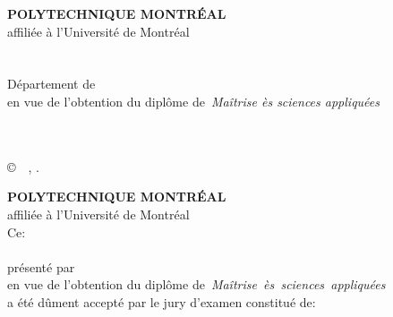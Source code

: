 \documentclass[letterpaper,oneside,final]{book}
\newcommand\monDipl{Maîtrise ès sciences appliquées}
\newcommand\monDipl{Philosophi\ae{} Doctor}
\begin{document}

\frontmatter
{}
\thispagestyle{empty}%
\begin{center}%
\textbf{POLYTECHNIQUE MONTRÉAL}\\
affiliée à l'Université de Montréal\\
\textbf{\monTitre}\\
\textbf{\MakeUppercase{\monPrenom~\monNom}}\\
Département de~{\monDepartement}\\
 en vue de l'obtention du diplôme de~\emph{\monDipl}\\
\maDiscipline\\
\vskip 0.4in
\moisDepot~\anneeDepot%
\end{center}%
\copyright~\monPrenom~\monNom, \anneeDepot.
\newpage\thispagestyle{empty}%
\begin{center}%

\textbf{POLYTECHNIQUE MONTRÉAL}\\
affiliée à l'Université de Montréal\\
Ce:\\
\textbf{\monTitre}\\
présenté
par~\textbf{\mbox{\monPrenom~\MakeUppercase{\monNom}}}\\
en vue de l'obtention du diplôme de~\emph{\mbox{\monDipl}}\\
a été dûment accepté par le jury d'examen constitué de:
\end{center}
\monJury%
\pagestyle{pagenumber}%




\end{document}
